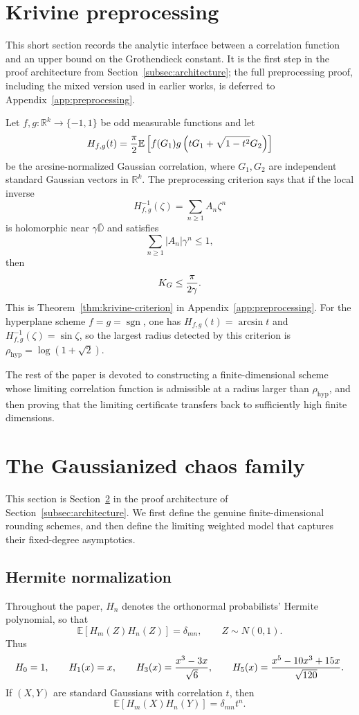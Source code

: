 \documentclass[11pt]{article}
\newcommand{\R}{\mathbb R}
\newcommand{\D}{\mathbb D}
\newcommand{\E}{\mathbb E}
\newcommand{\1}{\mathbf 1}
\newcommand{\sgn}{\operatorname{sgn}}
\newcommand{\KG}{K_G}
\theoremstyle{plain}
\theoremstyle{definition}
\theoremstyle{remark}
\begin{document}
\section{Krivine preprocessing}\label{sec:krivine}

This short section records the analytic interface between a correlation function and an upper bound on the Grothendieck constant.  It is the first step in the proof architecture from Section~\ref{subsec:architecture}; the full preprocessing proof, including the mixed version used in earlier works, is deferred to Appendix~\ref{app:preprocessing}.

Let $f,g:\R^k\to\{-1,1\}$ be odd measurable functions and let
\[
  H_{f,g}(t)={\pi\over2}\E\left[f(G_1)g\left(tG_1+\sqrt{1-t^2}G_2\right)\right]
\]
be the arcsine-normalized Gaussian correlation, where $G_1,G_2$ are independent standard Gaussian vectors in $\R^k$.  The preprocessing criterion says that if the local inverse
\[
  H_{f,g}^{-1}(\zeta)=\sum_{n\ge1}A_n\zeta^n
\]
is holomorphic near $\gamma\overline{\D}$ and satisfies
\[
  \sum_{n\ge1}|A_n|\gamma^n\le1,
\]
then
\[
  \KG\le {\pi\over2\gamma}.
\]
This is Theorem~\ref{thm:krivine-criterion} in Appendix~\ref{app:preprocessing}.  For the hyperplane scheme $f=g=\sgn$, one has $H_{f,g}(t)=\arcsin t$ and $H_{f,g}^{-1}(\zeta)=\sin\zeta$, so the largest radius detected by this criterion is $\rho_{\mathrm{hyp}}=\log(1+\sqrt2)$.

The rest of the paper is devoted to constructing a finite-dimensional scheme whose limiting correlation function is admissible at a radius larger than $\rho_{\mathrm{hyp}}$, and then proving that the limiting certificate transfers back to sufficiently high finite dimensions.

\section{The Gaussianized chaos family}\label{sec:scheme}

This section is Section~\ref{sec:scheme} in the proof architecture of Section~\ref{subsec:architecture}.  We first define the genuine finite-dimensional rounding schemes, and then define the limiting weighted model that captures their fixed-degree asymptotics.

\subsection{Hermite normalization}

Throughout the paper, \(H_n\) denotes the orthonormal probabilists' Hermite polynomial, so that
\[
  \E[H_m(Z)H_n(Z)]=\delta_{mn},\qquad Z\sim N(0,1).
\]
Thus
\[
  H_0=1,
  \qquad H_1(x)=x,
  \qquad H_3(x)={x^3-3x\over\sqrt6},
  \qquad H_5(x)={x^5-10x^3+15x\over\sqrt{120}}.
\]
If \((X,Y)\) are standard Gaussians with correlation \(t\), then
\begin{equation}\label{eq:hermite-cov}
  \E[H_m(X)H_n(Y)]=\delta_{mn}t^n.
\end{equation}
\end{document}
